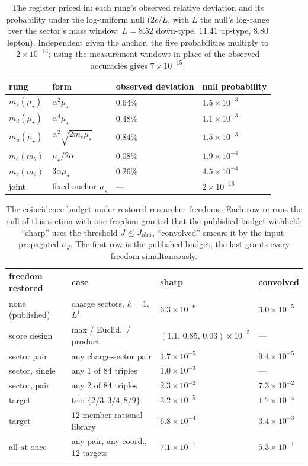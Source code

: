 \documentclass[11pt]{article}
\begin{document}
\begin{table}[t]
\caption{The register priced in: each rung's observed relative deviation
and its probability under the log-uniform null ($2\epsilon/L$, with $L$
the null's log-range over the sector's mass window: $L = 8.52$ down-type,
$11.41$ up-type, $8.80$ lepton). Independent given the
anchor, the five probabilities multiply to $2\times10^{-16}$; using the
measurement windows in place of the observed accuracies gives
$7\times10^{-15}$.}
\label{tab:rungs}
\begin{tabular}{llll}\toprule
rung & form & observed deviation & null probability \\
\midrule
$m_s(\mu_\star)$ & $\alpha^2\mu_\star$ & $0.64\%$ & $1.5\times10^{-3}$ \\
$m_d(\mu_\star)$ & $\alpha^4\mu_\star$ & $0.48\%$ & $1.1\times10^{-3}$ \\
$m_u(\mu_\star)$ & $\alpha^2\sqrt{2m_e\mu_\star}$ & $0.84\%$ & $1.5\times10^{-3}$ \\
$m_b(m_b)$ & $\mu_\star/2\alpha$ & $0.08\%$ & $1.9\times10^{-4}$ \\
$m_c(m_c)$ & $3\alpha\mu_\star$ & $0.26\%$ & $4.5\times10^{-4}$ \\
\midrule
joint & fixed anchor $\mu_\star$ & --- & $2\times10^{-16}$ \\
\bottomrule\end{tabular}
\end{table}

\begin{table}[t]
\caption{The coincidence budget under restored researcher freedoms. Each row
re-runs the null of this section with one freedom granted that the published
budget withheld; ``sharp'' uses the threshold $J \le J_{\rm obs}$,
``convolved'' smears it by the input-propagated $\sigma_J$. The first row is
the published budget; the last grants every freedom simultaneously.}
\label{tab:sensitivity}
\begin{tabular}{llll}\toprule
freedom restored & case & sharp & convolved \\
\midrule
none (published) & charge sectors, $k=1$, $L^1$ & $6.3\times10^{-6}$ & $3.0\times10^{-5}$ \\
score design & max / Euclid.\ / product & $(1.1,\,0.85,\,0.03)\times10^{-5}$ & --- \\
sector pair & any charge-sector pair & $1.7\times10^{-5}$ & $9.4\times10^{-5}$ \\
sector, single & any 1 of 84 triples & $1.0\times10^{-3}$ & --- \\
sector, pair & any 2 of 84 triples & $2.3\times10^{-2}$ & $7.3\times10^{-2}$ \\
target & trio $\{2/3, 3/4, 8/9\}$ & $3.2\times10^{-5}$ & $1.7\times10^{-4}$ \\
target & 12-member rational library & $6.8\times10^{-4}$ & $3.4\times10^{-3}$ \\
all at once & any pair, any coord., 12 targets & $7.1\times10^{-1}$ & $5.3\times10^{-1}$ \\
\bottomrule\end{tabular}
\end{table}
\end{document}
